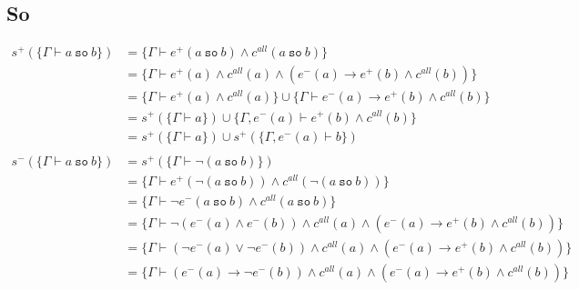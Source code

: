 \documentclass[12pt]{article}
\newcommand{\so}{~\texttt{so}~}
\begin{document}
\subsection*{So}
\begin{align*}
  s^+ (\{\Gamma \vdash a \so b\})      & = \{\Gamma \vdash e^+(a \so b) \land c^{all}(a \so b)\}                                                                               \\
                                       & = \{\Gamma \vdash e^+(a) \land c^{all}(a) \land (e^-(a) \rightarrow e^+(b) \land c^{all} (b))\}                                       \\
                                       & = \{\Gamma \vdash e^+(a) \land c^{all}(a)\} \cup \{\Gamma \vdash e^-(a) \rightarrow e^+(b) \land c^{all} (b)\}                        \\
                                       & = s^+(\{\Gamma \vdash a\}) \cup \{\Gamma, e^-(a) \vdash e^+(b) \land c^{all} (b)\}                                                    \\
                                       & = s^+(\{\Gamma \vdash a\}) \cup s^+(\{\Gamma, e^-(a) \vdash b\})                                                                      \\
  \\
  s^- (\{\Gamma \vdash a \so b\})      & = s^+ (\{\Gamma \vdash \neg (a \so b)\})                                                                                              \\
                                       & = \{\Gamma \vdash e^+(\neg (a \so b)) \land c^{all} (\neg (a \so b))\}                                                                \\
                                       & = \{\Gamma \vdash \neg e^-(a \so b) \land c^{all} (a \so b)\}                                                                         \\
                                       & = \{\Gamma \vdash \neg (e^-(a) \land e^-(b)) \land c^{all}(a) \land (e^-(a) \rightarrow e^+(b) \land c^{all} (b))\}                   \\
                                       & = \{\Gamma \vdash (\neg e^-(a) \lor \neg e^-(b)) \land c^{all}(a) \land (e^-(a) \rightarrow e^+(b) \land c^{all} (b))\}               \\
                                       & = \{\Gamma \vdash (e^-(a) \rightarrow \neg e^-(b)) \land c^{all}(a) \land (e^-(a) \rightarrow e^+(b) \land c^{all} (b))\}             \\

\end{align*}
\end{document}

